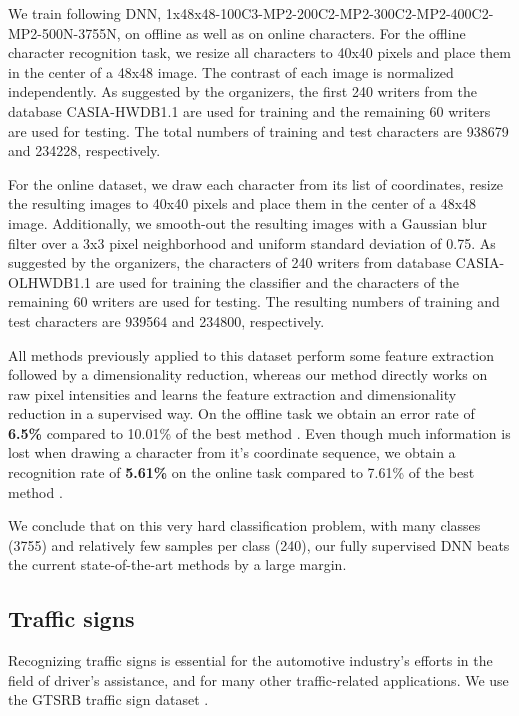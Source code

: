 \documentclass[a4paper]{article}
\begin{document}
We train following DNN, 1x48x48-100C3-MP2-200C2-MP2-300C2-MP2-400C2-MP2-500N-3755N, on offline as well as on online characters. For the offline character recognition task, we resize all characters to 40x40 pixels and place them in the center of a 48x48 image. The contrast of each image is normalized independently. As suggested by the organizers, the first 240 writers from the database CASIA-HWDB1.1 are used for training and the remaining 60 writers are used for testing. The total numbers of training and test characters are 938679 and 234228, respectively.

For the online dataset, we draw each character from its list of coordinates, resize the resulting images to 40x40 pixels and place them in the center of a 48x48 image. Additionally, we smooth-out the resulting images with a Gaussian blur filter over a 3x3 pixel neighborhood and uniform standard deviation of 0.75. As suggested by the organizers, the characters of 240 writers from database CASIA-OLHWDB1.1 are used for training the classifier and the characters of the remaining 60 writers are used for testing. The resulting numbers of training and test characters are 939564 and 234800, respectively.

All methods previously applied to this dataset perform some feature extraction followed by a dimensionality reduction, whereas our method directly works on raw pixel intensities and learns the feature extraction and dimensionality reduction in a supervised way. On the offline task we obtain an error rate of {\bf 6.5\%} compared to 10.01\% of the best method \cite{cheng-lin:2010}. Even though much information is lost when drawing a character from it's coordinate sequence, we obtain a recognition rate of {\bf 5.61\%} on the online task compared to 7.61\% of the best method \cite{cheng-lin:2010}.

We conclude that on this very hard classification problem, with many classes (3755) and relatively few samples per class (240), our fully supervised DNN beats the current state-of-the-art methods by a large margin.


\subsection{Traffic signs}
Recognizing traffic signs is essential for the automotive industry's efforts in the field of driver's assistance, and for many other traffic-related applications. We use the GTSRB traffic sign dataset \cite{stallkamp:2011}. 
\end{document}
